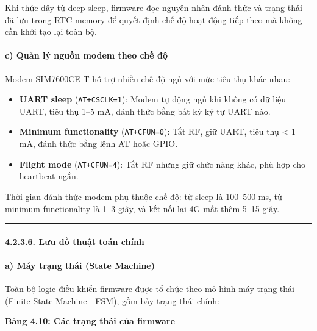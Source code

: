 \documentclass[13pt,a4paper]{extarticle}
\renewcommand{\\}{\thesislongtableorignewline\hline}%
\newcommand{\thesistabletitle}[1]{%
  \begin{center}\textbf{#1}\end{center}%
}
\providecommand{\tightlist}{%
  \setlength{\itemsep}{0pt}\setlength{\parskip}{0pt}}
\begin{document}
Khi thức dậy từ deep sleep, firmware đọc nguyên nhân đánh thức và trạng
thái đã lưu trong RTC memory để quyết định chế độ hoạt động tiếp theo mà
không cần khởi tạo lại toàn bộ.

\paragraph{c) Quản lý nguồn modem theo chế
độ}\label{c-quux1ea3n-luxfd-nguux1ed3n-modem-theo-chux1ebf-ux111ux1ed9}

Modem SIM7600CE-T hỗ trợ nhiều chế độ ngủ với mức tiêu thụ khác nhau:

\begin{itemize}
\tightlist
\item
  \textbf{UART sleep} (\texttt{AT+CSCLK=1}): Modem tự động ngủ khi không
  có dữ liệu UART, tiêu thụ 1--5 mA, đánh thức bằng bất kỳ ký tự UART
  nào.
\item
  \textbf{Minimum functionality} (\texttt{AT+CFUN=0}): Tắt RF, giữ UART,
  tiêu thụ \textless{} 1 mA, đánh thức bằng lệnh AT hoặc GPIO.
\item
  \textbf{Flight mode} (\texttt{AT+CFUN=4}): Tắt RF nhưng giữ chức năng
  khác, phù hợp cho heartbeat ngắn.
\end{itemize}

Thời gian đánh thức modem phụ thuộc chế độ: từ sleep là 100--500 ms, từ
minimum functionality là 1--3 giây, và kết nối lại 4G mất thêm 5--15
giây.

\begin{center}\rule{0.5\linewidth}{0.5pt}\end{center}

\paragraph{4.2.3.6. Lưu đồ thuật toán
chính}\label{4236-lux1b0u-ux111ux1ed3-thuux1eadt-touxe1n-chuxednh}

\paragraph{a) Máy trạng thái (State
Machine)}\label{a-muxe1y-trux1ea1ng-thuxe1i-state-machine}

Toàn bộ logic điều khiển firmware được tổ chức theo mô hình máy trạng
thái (Finite State Machine - FSM), gồm bảy trạng thái chính:

\thesistabletitle{Bảng 4.10: Các trạng thái của firmware}
\end{document}
